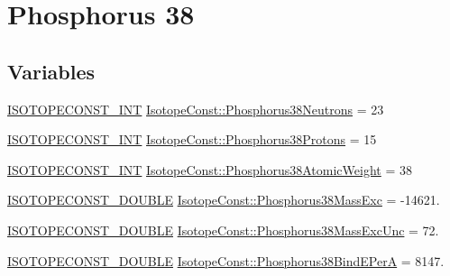 \hypertarget{group___isotope_const-_phosphorus-_p38}{}\section{Phosphorus 38}
\label{group___isotope_const-_phosphorus-_p38}
\subsection*{Variables}
\begin{DoxyCompactItemize}
\item 
\mbox{\hyperlink{group___isotope_const-_macros_ga5f18360b3e99483a35c32d789e62621c}{I\+S\+O\+T\+O\+P\+E\+C\+O\+N\+S\+T\+\_\+\+I\+NT}} \mbox{\hyperlink{group___isotope_const-_phosphorus-_p38_ga070a394ad9f05c0c0763f402c8a29c28}{Isotope\+Const\+::\+Phosphorus38\+Neutrons}} = 23
\item 
\mbox{\hyperlink{group___isotope_const-_macros_ga5f18360b3e99483a35c32d789e62621c}{I\+S\+O\+T\+O\+P\+E\+C\+O\+N\+S\+T\+\_\+\+I\+NT}} \mbox{\hyperlink{group___isotope_const-_phosphorus-_p38_ga1aeb45334dcda9440c033d7d20a54372}{Isotope\+Const\+::\+Phosphorus38\+Protons}} = 15
\item 
\mbox{\hyperlink{group___isotope_const-_macros_ga5f18360b3e99483a35c32d789e62621c}{I\+S\+O\+T\+O\+P\+E\+C\+O\+N\+S\+T\+\_\+\+I\+NT}} \mbox{\hyperlink{group___isotope_const-_phosphorus-_p38_ga13af497e73ade0d3f003c02352868ffc}{Isotope\+Const\+::\+Phosphorus38\+Atomic\+Weight}} = 38
\item 
\mbox{\hyperlink{group___isotope_const-_macros_ga8f45a7272ce02c0b4c65c44636ed719a}{I\+S\+O\+T\+O\+P\+E\+C\+O\+N\+S\+T\+\_\+\+D\+O\+U\+B\+LE}} \mbox{\hyperlink{group___isotope_const-_phosphorus-_p38_gae56a53a4d0f5627648ece732e610130c}{Isotope\+Const\+::\+Phosphorus38\+Mass\+Exc}} = -\/14621.
\item 
\mbox{\hyperlink{group___isotope_const-_macros_ga8f45a7272ce02c0b4c65c44636ed719a}{I\+S\+O\+T\+O\+P\+E\+C\+O\+N\+S\+T\+\_\+\+D\+O\+U\+B\+LE}} \mbox{\hyperlink{group___isotope_const-_phosphorus-_p38_ga64f16f5306698577b05ca2be29afcd1e}{Isotope\+Const\+::\+Phosphorus38\+Mass\+Exc\+Unc}} = 72.
\item 
\mbox{\hyperlink{group___isotope_const-_macros_ga8f45a7272ce02c0b4c65c44636ed719a}{I\+S\+O\+T\+O\+P\+E\+C\+O\+N\+S\+T\+\_\+\+D\+O\+U\+B\+LE}} \mbox{\hyperlink{group___isotope_const-_phosphorus-_p38_gaf0aa5f33be39b2b4f0fcadb6d2c90326}{Isotope\+Const\+::\+Phosphorus38\+Bind\+E\+PerA}} = 8147.
\item 

\end{DoxyCompactItemize}
